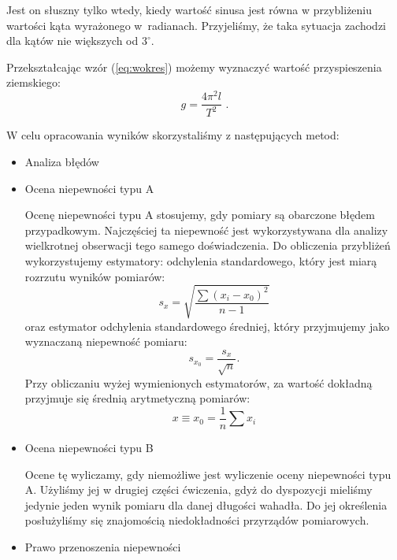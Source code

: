 \documentclass [a4paper,11pt]{article}
\begin{document}
	Jest on słuszny tylko wtedy, kiedy wartość sinusa jest równa w przybliżeniu wartości kąta wyrażonego w~radianach.
	Przyjeliśmy, że taka sytuacja zachodzi dla kątów nie większych od $3^\circ$.
	
	Przekształcając wzór (\ref{eq:wokres}) możemy wyznaczyć wartość przyspieszenia ziemskiego:
	\begin{equation}
	\label{eq:wprzysp} 
	g= \frac{4 \pi^2 l}{T^2} \text{ .}
	\end{equation}
	
	W celu opracowania wyników skorzystaliśmy z następujących metod:
	\begin{itemize}
		\item Analiza błędów 
		\item Ocena niepewności typu A
		
		Ocenę niepewności typu A stosujemy, gdy pomiary są obarczone błędem przypadkowym. Najczęściej ta niepewność jest wykorzystywana dla analizy wielkrotnej obserwacji tego samego doświadczenia. Do obliczenia przybliżeń wykorzystujemy estymatory: odchylenia standardowego, który jest miarą rozrzutu wyników pomiarów:
		\begin{equation}
		\label{eq:estymator}
		s_x = \sqrt{\frac{\sum (x_i -x_0)^2}{n-1}}
		\end{equation}
		oraz estymator odchylenia standardowego średniej, który przyjmujemy jako wyznaczaną niepewność pomiaru:
		\begin{equation}
			\label{eq:estymatorsredniej}
			s_{x_0}=\frac{s_x}{\sqrt{n}} \text{.}
		\end{equation}
		Przy obliczaniu wyżej wymienionych estymatorów, za wartość dokładną przyjmuje się średnią arytmetyczną pomiarów:
		\begin{equation}
		\label{eq:wstepsrednia}
		x \equiv x_0 = \frac{1}{n}\sum x_i
		\end{equation}
		
		\item Ocena niepewności typu B
		
		Ocene tę wyliczamy, gdy niemożliwe jest wyliczenie oceny niepewności typu A. Użyliśmy jej w drugiej części ćwiczenia, gdyż do dyspozycji mieliśmy jedynie jeden wynik pomiaru dla danej długości wahadła. Do jej określenia posłużyliśmy się znajomością niedokładności przyrządów pomiarowych.
		
		\item Prawo przenoszenia niepewności
		

\end{itemize}
\end{document}
